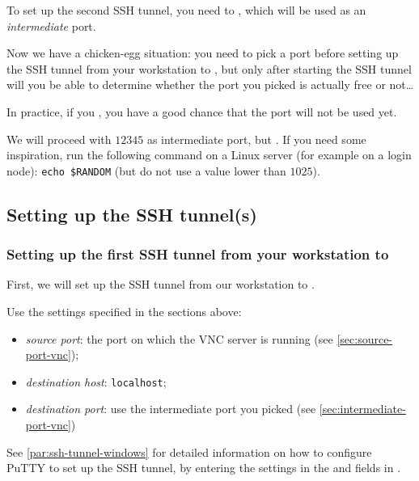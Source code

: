 To set up the second SSH tunnel, you need to ,
which will be used as an \emph{intermediate} port.

Now we have a chicken-egg situation: you need to pick a port before setting up the SSH tunnel from your workstation
to \texttt{\loginhost}, but only after starting the SSH tunnel will you be able to determine whether the port you
picked is actually free or not\ldots

In practice, if you , you have a good chance that the
port will not be used yet.

We will proceed with $12345$ as intermediate port, but . If you need some inspiration, run the following command on a Linux server
(for example on a login node): \texttt{echo \$RANDOM} (but do not use a value lower than $1025$).

\subsection{Setting up the SSH tunnel(s)}
\label{sec:ssh-tunnel-vnc}

\subsubsection{Setting up the first SSH tunnel from your workstation to \loginnode}

First, we will set up the SSH tunnel from our workstation to \loginnode.

Use the settings specified in the sections above:

\begin{itemize}
\item \emph{source port}: the port on which the VNC server is running (see \autoref{sec:source-port-vnc});
\item \emph{destination host}: \lstinline|localhost|;
\item \emph{destination port}: use the intermediate port you picked (see \autoref{sec:intermediate-port-vnc})
\end{itemize}

\ifwindows

See \autoref{par:ssh-tunnel-windows} for detailed information on how to configure PuTTY to set up the SSH tunnel,
by entering the settings in the  and  fields in .

